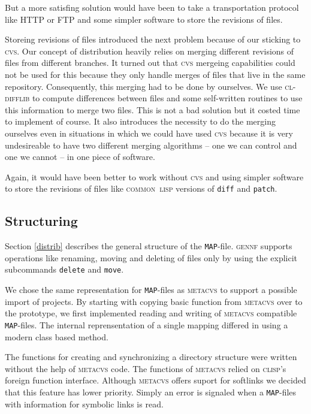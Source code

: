 \documentclass[fleqn, 10pt, a4paper]{report} \usepackage{amssymb}
\newcommand{\GENNF}{\textsc{gennf}}
\begin{document}
But a more satisfing solution would have been to take a
transportation protocol like HTTP or FTP and some simpler software to
store the revisions of files.

Storeing revisions of files introduced the next problem because of our
sticking to \textsc{cvs}. Our concept of distribution heavily relies
on merging different revisions of files from different branches. It
turned out that \textsc{cvs} mergeing capabilities could not be used
for this because they only handle merges of files that live in the
same repository. Consequently, this merging had to be done by
ourselves. We use \textsc{cl-difflib} \cite{Cldi06} to compute
differences between files and some self-written routines to use this
information to merge two files. This is not a bad solution but it
costed time to implement of course. It also introduces the necessity
to do the merging ourselves even in situations in which we could have
used \textsc{cvs} because it is very undesireable to have two
different merging algorithms -- one we can control and one we cannot
-- in one piece of software.

Again, it would have been better to work without \textsc{cvs} and
using simpler software to store the revisions of files like
\textsc{common~lisp} versions of \texttt{diff} and \texttt{patch}.


\subsection{Structuring} 

Section \ref{distrib} describes the general structure of the
\texttt{MAP}-file. \GENNF{} supports operations like renaming, moving
and deleting of files only by using the explicit subcommands
\texttt{delete} and \texttt{move}.

We chose the same representation for \texttt{MAP}-files as
\textsc{metacvs} to support a possible import of projects. By starting
with copying basic function from \textsc{metacvs} over to the
prototype, we first implemented reading and writing of
\textsc{metacvs} compatible \texttt{MAP}-files. The internal
reprensentation of a single mapping differed in using a modern class
based method.

The functions for creating and synchronizing a directory structure
were written without the help of \textsc{metacvs} code. The functions
of \textsc{metacvs} relied on \textsc{clisp}'s foreign function
interface. Although \textsc{metacvs} offers suport for softlinks we
decided that this feature has lower priority. Simply an error is
signaled when a \texttt{MAP}-files with information for symbolic links
is read.
\end{document}
